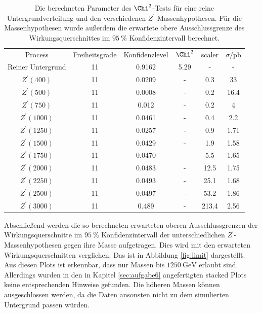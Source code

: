 \begin{table}
  \centering
  \caption{Die berechneten Parameter des $\Chi^2$-Tests für eine reine Untergrundverteilung und den verschiedenen $Z^\prime$-Massenhypothesen. Für die Massenhypothesen wurde außerdem die erwartete obere Ausschlussgrenze des Wirkungsquerschnittes im $\SI{95}{\percent}$ Konfidenzintervall berechnet.}
  \label{tab:chi2}
  \begin{tabular}{c|ccccc}
    \toprule
    Process & Freiheitsgrade & Konfidenzlevel & $\Chi^2$ & scaler & $\sigma / \si{\pico\barn}$ \\
    Reiner Untergrund & 11 & 0.9162 & 5.29 & - & - \\
    $Z^\prime (400)$  & 11 & 0.0209 & - & 0.3 & 33 \\
    $Z^\prime (500)$  & 11 & 0.0008 & - & 0.2 & 16.4 \\
    $Z^\prime (750)$  & 11 & 0.012 & - & 0.2 & 4 \\
    $Z^\prime (1000)$ & 11 & 0.0461 & - & 0.4 & 2.2 \\
    $Z^\prime (1250)$ & 11 & 0.0257 & - & 0.9 & 1.71 \\
    $Z^\prime (1500)$ & 11 & 0.0429 & - & 1.9 & 1.58 \\
    $Z^\prime (1750)$ & 11 & 0.0470 & - & 5.5 & 1.65 \\
    $Z^\prime (2000)$ & 11 & 0.0483 & - & 12.5 & 1.75 \\
    $Z^\prime (2250)$ & 11 & 0.0493 & - & 25.1 & 1.68 \\
    $Z^\prime (2500)$ & 11 & 0.0497 & - & 53.2 & 1.86 \\
    $Z^\prime (3000)$ & 11 & 0.489 & - & 213.4 & 2.56 \\
    \midrule
    \bottomrule
  \end{tabular}
\end{table}

Abschließend werden die so berechneten erwarteten oberen Ausschlussgrenzen der Wirkungsquerschnitte im $\SI{95}{\percent}$ Konfidenzintervall der unterschiedlichen $Z^\prime$-Massenhypothesen gegen ihre Masse aufgetragen.
Dies wird mit den erwarteten Wirkungsquerschnitten verglichen.
Das ist in Abbildung \ref{fig:limit} dargestellt.
Aus diesen Plots ist erkennbar, dass nur Massen bis $\SI{1250}{\giga\electronvolt}$ erlaubt sind.
Allerdings wurden in den in Kapitel \ref{sec:aufgabe6} angefertigten stacked Plots keine entsprechenden Hinweise gefunden.
Die höheren Massen können ausgeschlossen werden, da die Daten ansonsten nicht zu dem simulierten Untergrund passen würden.

